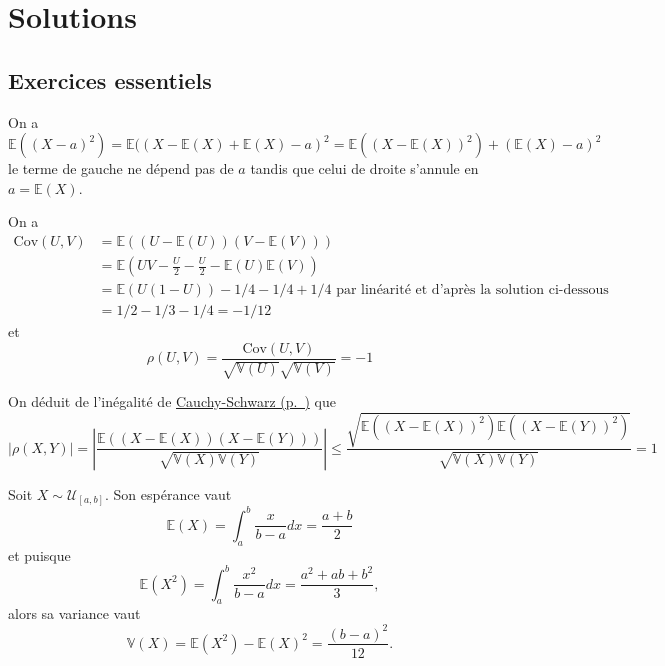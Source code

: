 \chapter{Solutions}

\section{Exercices essentiels}\label{II-exercices-essentiels}

\label{II-answer-exo-approx}
On a
\[\mathbb{E}((X-a)^2) = \mathbb{E}((X-\mathbb{E}(X) + \mathbb{E}(X) - a)^2 = \mathbb{E}((X - \mathbb{E}(X))^2 ) + (\mathbb{E}(X) - a)^2\]
le terme de gauche ne dépend pas de \(a\) tandis que celui de droite
s'annule en \(a = \mathbb{E}(X)\).

\label{II-answer-cov-unif}
On a \begin{align*}
\text{Cov}(U,V) &= \mathbb{E}((U-\mathbb{E}(U))(V-\mathbb{E}(V)))\\
          &= \mathbb{E}(UV - \frac{U}{2} - \frac{U}{2} - \mathbb{E}(U)\mathbb{E}(V))\\
          &= \mathbb{E}(U(1-U)) - 1/4 - 1/4 +1/4 \text{ par linéarité et d'après la solution ci-dessous}\\
          &= 1/2 - 1/3 -1/4 = -1/12
\end{align*} et
\[\rho(U,V) = \frac{\text{Cov}(U,V)}{\sqrt{\mathbb{V}(U)}\sqrt{\mathbb{V}(V)}} = -1\]

\label{II-answer-CS-corr}
On déduit de l'inégalité de
\protect\hyperref[II-CS]{Cauchy-Schwarz (p.~\pageref*{II-CS})} que
\[|\rho(X,Y)| = \left|\frac{\mathbb{E}((X-\mathbb{E}(X))(X-\mathbb{E}(Y)))}{\sqrt{\mathbb{V}(X)\mathbb{V}(Y)}} \right| \leq \frac{\sqrt{\mathbb{E}((X-\mathbb{E}(X))^2)\mathbb{E}((X-\mathbb{E}(Y))^2)}}{\sqrt{\mathbb{V}(X)\mathbb{V}(Y)}} =1\]

\label{II-answer-moments-unif}
Soit \(X \sim \mathcal{U}_{[a,b]}\). Son espérance vaut
\[\mathbb{E}(X) = \int_a^b \frac{x}{b-a} dx = \frac{a+b}{2}\] et puisque
\[\mathbb{E}(X^2) = \int_a^b \frac{x^2}{b-a} dx = \frac{a^2 + ab +b^2}{3},\]
alors sa variance vaut
\[\mathbb{V}(X) = \mathbb{E}(X^2) - \mathbb{E}(X)^2 = \frac{(b-a)^2}{12}.\]

